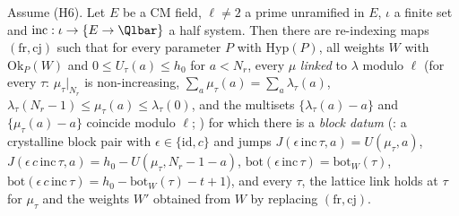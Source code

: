 \begin{proposition}\label{pf:onto2:latlink}
Assume (H6). Let $E$ be a CM field, $\ell\ne2$ a prime unramified in $E$, $\iota$ a finite set and $\mathrm{inc}:\iota\to\{E\to\Qlbar\}$
a half system. Then there are re-indexing maps $(\mathrm{fr},\mathrm{cj})$ such that for every parameter $P$ with $\mathrm{Hyp}(P)$, all
weights $W$ with $\mathrm{Ok}_P(W)$ and $0\le U_\tau(a)\le h_0$ for $a<N_r$, every $\mu$ \emph{linked} to $\lambda$ modulo $\ell$ (for
every $\tau$: $\mu_\tau|_{N_r}$ is non-increasing, $\sum_a\mu_\tau(a)=\sum_a\lambda_\tau(a)$, $\lambda_\tau(N_r-1)\le\mu_\tau(a)\le
\lambda_\tau(0)$, and the multisets $\{\lambda_\tau(a)-a\}$ and $\{\mu_\tau(a)-a\}$ coincide modulo $\ell$;
) for which there is a \emph{block datum} (: a
crystalline block pair with $\epsilon\in\{\mathrm{id},c\}$ and jumps $J(\epsilon\,\mathrm{inc}\,\tau,a)=U(\mu_\tau,a)$,
$J(\epsilon\,c\,\mathrm{inc}\,\tau,a)=h_0-U(\mu_\tau,N_r-1-a)$, $\mathrm{bot}(\epsilon\,\mathrm{inc}\,\tau)=\mathrm{bot}_W(\tau)$,
$\mathrm{bot}(\epsilon\,c\,\mathrm{inc}\,\tau)=h_0-\mathrm{bot}_W(\tau)-t+1$), and every $\tau$, the lattice link holds at $\tau$ for $\mu_\tau$
and the weights $W'$ obtained from $W$ by replacing $(\mathrm{fr},\mathrm{cj})$.
\end{proposition}

